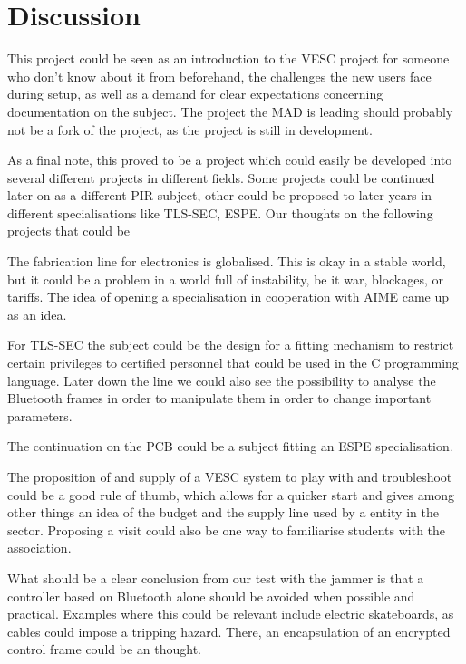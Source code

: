 \section{Discussion}
This project could be seen as an introduction to the VESC project for someone who don't know about it from beforehand, the challenges the new users face during setup, as well as a demand for clear expectations concerning documentation on the subject. The project the MAD is leading should probably not be a fork of the project, as the project is still in development.

As a final note, this proved to be a project which could easily be developed into several different projects in different fields. Some projects could be continued later on as a different PIR subject, other could be proposed to later years in different specialisations like TLS-SEC, ESPE. Our thoughts on the following projects that could be 

The fabrication line for electronics is globalised. This is okay in a stable world, but it could be a problem in a world full of instability, be it war, blockages, or tariffs. The idea of opening a specialisation in cooperation with AIME came up as an idea.

For TLS-SEC the subject could be the design for a fitting mechanism to restrict certain privileges to certified personnel that could be used in the C programming language. Later down the line we could also see the possibility to analyse the Bluetooth frames in order to manipulate them in order to change important parameters.

The continuation on the PCB could be a subject fitting an ESPE specialisation.

The proposition of and supply of a VESC system to play with and troubleshoot could be a good rule of thumb, which allows for a quicker start and gives among other things an idea of the budget and the supply line used by a entity in the sector. Proposing a visit could also be one way to familiarise students with the association.

What should be a clear conclusion from our test with the jammer is that a controller based on Bluetooth alone should be avoided when possible and practical. Examples where this could be relevant include electric skateboards, as cables could impose a tripping hazard. There, an encapsulation of an encrypted control frame could be an thought. 



